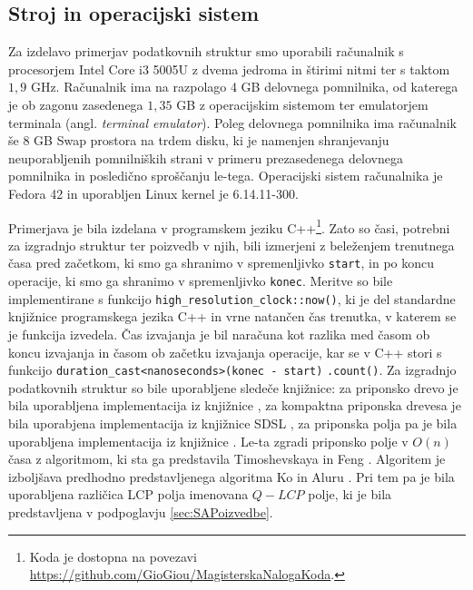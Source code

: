 \subsection{Stroj in operacijski sistem}
Za izdelavo primerjav podatkovnih struktur smo uporabili računalnik s procesorjem Intel Core i3 5005U z dvema jedroma in štirimi nitmi ter s taktom $1,9$ GHz. Računalnik ima na razpolago 4 GB delovnega pomnilnika, od katerega je ob zagonu zasedenega $1,35$ GB z operacijskim sistemom ter emulatorjem terminala (angl. \textit{terminal emulator}). Poleg delovnega pomnilnika ima računalnik še $8$ GB Swap prostora na trdem disku, ki je namenjen shranjevanju neuporabljenih pomnilniških strani v primeru prezasedenega delovnega pomnilnika in posledično sproščanju le-tega. Operacijski sistem računalnika je Fedora 42 in uporabljen Linux kernel je 6.14.11-300.

Primerjava je bila izdelana v programskem jeziku C++\footnote{Koda je dostopna na povezavi \url{https://github.com/GioGiou/MagisterskaNalogaKoda}.}. Zato so časi, potrebni za izgradnjo struktur ter poizvedb v njih, bili izmerjeni z beleženjem trenutnega časa pred začetkom, ki smo ga shranimo v spremenljivko \verb|start|, in po koncu operacije, ki smo ga shranimo v spremenljivko \verb|konec|. Meritve so bile implementirane s funkcijo \verb|high_resolution_clock::now()|, ki je del standardne knjižnice programskega jezika C++ in vrne natančen čas trenutka, v katerem se je funkcija izvedela. Čas izvajanja je bil naračuna kot razlika med časom ob koncu izvajanja in časom ob začetku izvajanja operacije, kar se v C++ stori s funkcijo \verb|duration_cast<nanoseconds>(konec - start)| \verb|.count()|. Za izgradnjo podatkovnih struktur so bile uporabljene sledeče knjižnice: za priponsko drevo je bila uporabljena implementacija iz knjižnice \cite{ganeshk13}, za kompaktna priponska drevesa je bila uporabjena implementacija iz knjižnice SDSL \cite{gbmp2014sea}, za priponska polja pa je bila uporabljena implementacija iz knjižnice \cite{Grebnov2025}. Le-ta zgradi priponsko polje v $O(n)$ časa z algoritmom, ki sta ga predstavila Timoshevskaya in Feng \cite{Timoshevskaya2014}. Algoritem je izboljšava predhodno predstavljenega algoritma Ko in Aluru \cite{Ko2005}. Pri tem pa je bila uporabljena različica LCP polja imenovana $Q-LCP$ polje, ki je bila predstavljena v podpoglavju \ref{sec:SAPoizvedbe}.

